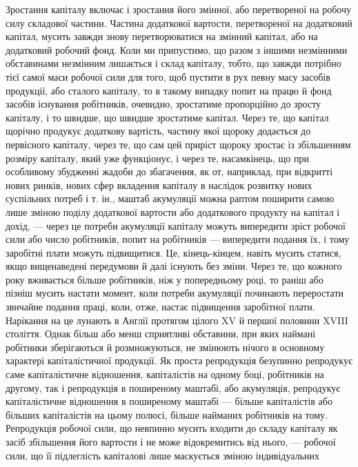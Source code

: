 Зростання капіталу включає і зростання його змінної, або
перетвореної на робочу силу складової частини. Частина додаткової
вартости, перетвореної на додатковий капітал, мусить завжди
знову перетворюватися на змінний капітал, або на додатковий
робочий фонд. Коли ми припустимо, що разом з іншими незмінними
обставинами незмінним лишається і склад капіталу, тобто,
що завжди потрібно тієї самої маси робочої сили для того, щоб
пустити в рух певну масу засобів продукції, або сталого капіталу,
то в такому випадку попит на працю й фонд засобів існування
робітників, очевидно, зростатиме пропорційно до зросту капіталу,
і то швидше, що швидше зростатиме капітал. Через те, що
капітал щорічно продукує додаткову вартість, частину якої
щороку додається до первісного капіталу, через те, що сам цей
приріст щороку зростає із збільшенням розміру капіталу, який
уже функціонує, і через те, насамкінець, що при особливому збудженні
жадоби до збагачення, як от, наприклад, при відкритті
нових ринків, нових сфер вкладення капіталу в наслідок розвитку
нових суспільних потреб і т. ін., маштаб акумуляції можна раптом
поширити самою лише зміною поділу додаткової вартости
або додаткового продукту на капітал і дохід, — через це потреби
акумуляції капіталу можуть випередити зріст робочої сили або
число робітників, попит на робітників — випередити подання
їх, і тому заробітні плати можуть підвищитися. Це, кінець-кінцем,
навіть мусить статися, якщо вищенаведені передумови й
далі існують без зміни. Через те, що кожного року вживається
більше робітників, ніж у попередньому році, то раніш або пізніш
мусить настати момент, коли потреби акумуляції починають
переростати звичайне подання праці, коли, отже, настає підвищення
заробітної плати. Нарікання на це лунають в Англії
протягом цілого XV й першої половини XVIII століття. Однак
більш або менш сприятливі обставини, при яких наймані робітники
зберігаються й розмножуються, не змінюють нічого в основному
характері капіталістичної продукції. Як проста репродукція
безупинно репродукує саме капіталістичне відношення,
капіталістів на одному боці, робітників на другому, так і репродукція
в поширеному маштабі, або акумуляція, репродукує
капіталістичне відношення в поширеному маштабі — більше капіталістів
або більших капіталістів на цьому полюсі, більше
найманих робітників на тому. Репродукція робочої сили, що невпинно
мусить входити до складу капіталу як засіб збільшення
його вартости і не може відокремитись від нього, — робочої сили,
що її підлеглість капіталові лише маскується зміною індивідуальних
